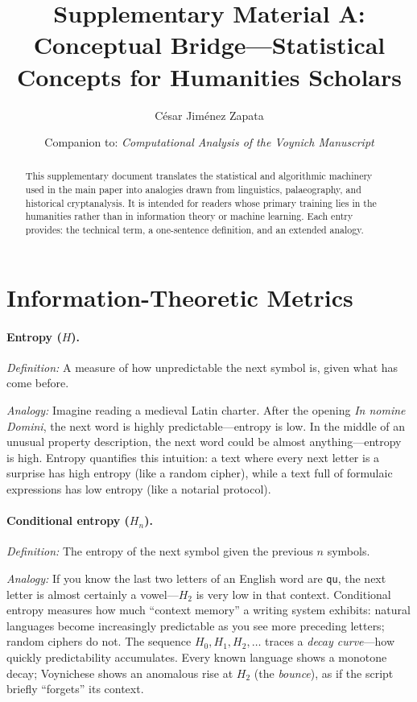 \documentclass[11pt,a4paper]{article}
\title{Supplementary Material A:\\Conceptual Bridge---Statistical Concepts for Humanities Scholars}
\author{C\'esar Jim\'enez Zapata}
\date{Companion to: \textit{Computational Analysis of the Voynich Manuscript}}
\begin{document}
\maketitle

\begin{abstract}
This supplementary document translates the statistical and algorithmic machinery used in the main paper into analogies drawn from linguistics, palaeography, and historical cryptanalysis.  It is intended for readers whose primary training lies in the humanities rather than in information theory or machine learning.  Each entry provides: the technical term, a one-sentence definition, and an extended analogy.
\end{abstract}

\tableofcontents
\bigskip

\section{Information-Theoretic Metrics}

\paragraph{Entropy ($H$).}
\textit{Definition:} A measure of how unpredictable the next symbol is, given what has come before.

\textit{Analogy:} Imagine reading a medieval Latin charter.  After the opening \textit{In nomine Domini}, the next word is highly predictable---entropy is low.  In the middle of an unusual property description, the next word could be almost anything---entropy is high.  Entropy quantifies this intuition: a text where every next letter is a surprise has high entropy (like a random cipher), while a text full of formulaic expressions has low entropy (like a notarial protocol).

\paragraph{Conditional entropy ($H_n$).}
\textit{Definition:} The entropy of the next symbol given the previous $n$ symbols.

\textit{Analogy:} If you know the last two letters of an English word are \texttt{qu}, the next letter is almost certainly a vowel---$H_2$ is very low in that context.  Conditional entropy measures how much ``context memory'' a writing system exhibits: natural languages become increasingly predictable as you see more preceding letters; random ciphers do not.  The sequence $H_0, H_1, H_2, \ldots$ traces a \textit{decay curve}---how quickly predictability accumulates.  Every known language shows a monotone decay; Voynichese shows an anomalous rise at $H_2$ (the \textit{bounce}), as if the script briefly ``forgets'' its context.
\end{document}
